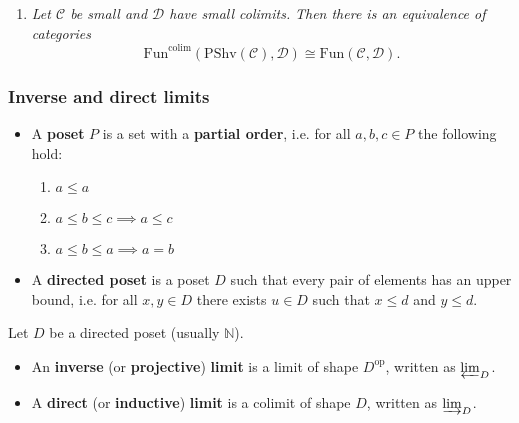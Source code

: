 \documentclass[10pt]{article}
\newcommand{\nn}{\mathbb{N}}
\newcommand{\ccat}{\mathcal{C}}
\newcommand{\dcat}{\mathcal{D}}
\newcommand{\Fun}{\mathrm{Fun}}
\newcommand{\PShv}{\mathrm{PShv}}
\newcommand{\op}[1]{{#1}^\text{op}}
\begin{document}
\begin{enumerate}
                    \item \emph{Let $\ccat$ be small and $\dcat$ have small colimits.}
                        \emph{Then there is an equivalence of categories}
                        \begin{equation*}
                            \Fun^\text{colim}(\PShv(\ccat),\dcat)\cong\Fun(\ccat,\dcat).
                        \end{equation*}

                \end{enumerate}

            \subsubsection{Inverse and direct limits}

                \begin{itemize}
                    \item A \textbf{poset} $P$ is a set with a \textbf{partial order}, i.e. for all $a,b,c\in P$ the following hold:
                        \begin{enumerate}
                            \item $a\leqslant a$
                            \item $a\leqslant b\leqslant c\implies a\leqslant c$
                            \item $a\leqslant b\leqslant a\implies a=b$
                        \end{enumerate}
                    \item A \textbf{directed poset} is a poset $D$ such that every pair of elements has an upper bound, i.e. for all $x,y\in D$ there exists $u\in D$ such that $x\leqslant d$ and $y\leqslant d$.
                \end{itemize}

                Let $D$ be a directed poset (usually $\nn$).

                \begin{itemize}
                    \item An \textbf{inverse} (or \textbf{projective}) \textbf{limit} is a limit of shape $\op{D}$, written as $\varprojlim_D$.
                    \item A \textbf{direct} (or \textbf{inductive}) \textbf{limit} is a colimit of shape $D$, written as $\varinjlim_D$.
                \end{itemize}
\end{document}
